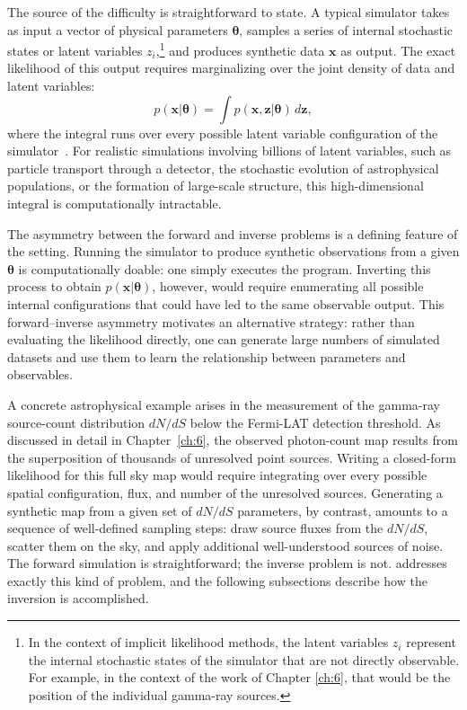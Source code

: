 The source of the difficulty is straightforward to state.
A typical simulator takes as input a vector of physical parameters $\boldsymbol{\theta}$, samples a series of internal stochastic states or latent variables $z_i$,\footnote{In the context of implicit likelihood methods, the latent variables $z_i$ represent the internal stochastic states of the simulator that are not directly observable. For example, in the context of the work of Chapter \ref{ch:6}, that would be the position of the individual gamma-ray sources.} and produces synthetic data $\mathbf{x}$ as output.
The exact likelihood of this output requires marginalizing over the joint density of data and latent variables:
\begin{equation}
	\label{eq:intractable_likelihood}
	p(\mathbf{x}|\boldsymbol{\theta}) = \int p(\mathbf{x}, \mathbf{z}|\boldsymbol{\theta}) \, d\mathbf{z},
\end{equation}
where the integral runs over every possible latent variable configuration of the simulator~\cite{Cranmer:2020}.
For realistic simulations involving billions of latent variables, such as particle transport through a detector, the stochastic evolution of astrophysical populations, or the formation of large-scale structure, this high-dimensional integral is computationally intractable.

The asymmetry between the forward and inverse problems is a defining feature of the \SBI setting.
Running the simulator to produce synthetic observations from a given $\boldsymbol{\theta}$ is computationally doable: one simply executes the program.
Inverting this process to obtain $p(\mathbf{x}|\boldsymbol{\theta})$, however, would require enumerating all possible internal configurations that could have led to the same observable output.
This forward--inverse asymmetry motivates an alternative strategy: rather than evaluating the likelihood directly, one can generate large numbers of simulated datasets and use them to learn the relationship between parameters and observables.

A concrete astrophysical example arises in the measurement of the gamma-ray source-count distribution $dN/dS$ below the Fermi-LAT detection threshold.
As discussed in detail in Chapter~\ref{ch:6}, the observed photon-count map results from the superposition of thousands of unresolved point sources.
Writing a closed-form likelihood for this full sky map would require integrating over every possible spatial configuration, flux, and number of the unresolved sources.
Generating a synthetic map from a given set of $dN/dS$ parameters, by contrast, amounts to a sequence of well-defined sampling steps: draw source fluxes from the $dN/dS$, scatter them on the sky, and apply additional well-understood sources of noise.
The forward simulation is straightforward; the inverse problem is not.
\SBI addresses exactly this kind of problem, and the following subsections describe how the inversion is accomplished.

